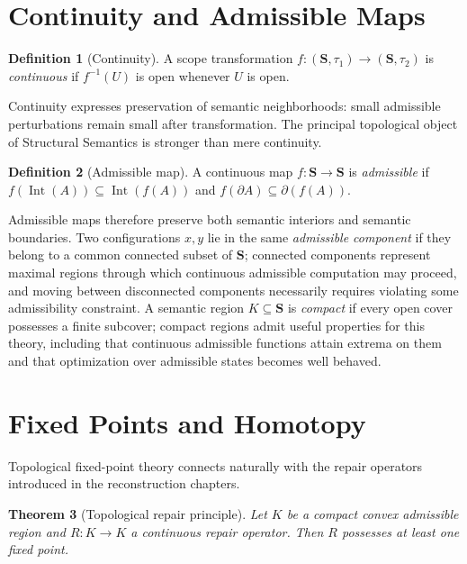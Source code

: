 \documentclass[11pt,twoside,openright]{book}
\numberwithin{equation}{chapter}
\theoremstyle{definition}
\newtheorem{definition}{Definition}[chapter]
\theoremstyle{plain}
\newtheorem{theorem}[definition]{Theorem}
\theoremstyle{remark}
\theoremstyle{definition}
\newcommand{\Scope}{\mathbf{S}}
\begin{document}
\section{Continuity and Admissible Maps}

\begin{definition}[Continuity]
A scope transformation $f:(\Scope,\tau_1)\to(\Scope,\tau_2)$ is
\emph{continuous} if $f^{-1}(U)$ is open whenever $U$ is open.
\end{definition}

Continuity expresses preservation of semantic neighborhoods: small
admissible perturbations remain small after transformation. The
principal topological object of Structural Semantics is stronger than
mere continuity.

\begin{definition}[Admissible map]
A continuous map $f:\Scope\to\Scope$ is \emph{admissible} if
$f(\operatorname{Int}(A))\subseteq\operatorname{Int}(f(A))$ and
$f(\partial A)\subseteq\partial(f(A))$.
\end{definition}

Admissible maps therefore preserve both semantic interiors and semantic
boundaries. Two configurations $x,y$ lie in the same \emph{admissible
component} if they belong to a common connected subset of $\Scope$;
connected components represent maximal regions through which continuous
admissible computation may proceed, and moving between disconnected
components necessarily requires violating some admissibility constraint.
A semantic region $K\subseteq\Scope$ is \emph{compact} if every open cover
possesses a finite subcover; compact regions admit useful properties for
this theory, including that continuous admissible functions attain
extrema on them and that optimization over admissible states becomes
well behaved.

\section{Fixed Points and Homotopy}

Topological fixed-point theory connects naturally with the repair
operators introduced in the reconstruction chapters.

\begin{theorem}[Topological repair principle]
Let $K$ be a compact convex admissible region and $R:K\to K$ a continuous
repair operator. Then $R$ possesses at least one fixed point.
\end{theorem}
\end{document}
